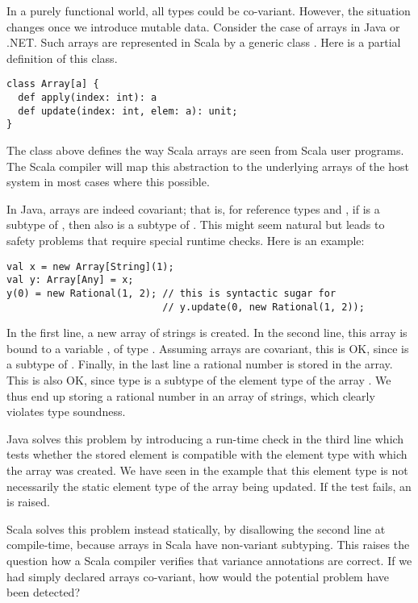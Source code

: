 \documentclass[a4paper,12pt,twoside,titlepage]{book}
\begin{document}
In a purely functional world, all types could be co-variant. However,
the situation changes once we introduce mutable data. Consider the
case of arrays in Java or .NET. Such arrays are represented in Scala
by a generic class . Here is a partial definition of this
class.
\begin{lstlisting}
class Array[a] {
  def apply(index: int): a
  def update(index: int, elem: a): unit;
}
\end{lstlisting}
The class above defines the way Scala arrays are seen from Scala user
programs. The Scala compiler will map this abstraction to the
underlying arrays of the host system in most cases where this
possible.

In Java, arrays are indeed covariant; that is, for reference types
 and , if  is a subtype of , then also
 is a subtype of . This might seem
natural but leads to safety problems that require special runtime
checks. Here is an example:
\begin{lstlisting}
val x = new Array[String](1);
val y: Array[Any] = x;
y(0) = new Rational(1, 2); // this is syntactic sugar for 
                           // y.update(0, new Rational(1, 2));
\end{lstlisting}
In the first line, a new array of strings is created. In the second
line, this array is bound to a variable , of type
.  Assuming arrays are covariant, this is OK, since
 is a subtype of . Finally, in
the last line a rational number is stored in the array. This is also
OK, since type  is a subtype of the element type
 of the array . We thus end up storing a rational
number in an array of strings, which clearly violates type soundness. 

Java solves this problem by introducing a run-time check in the third
line which tests whether the stored element is compatible with the
element type with which the array was created. We have seen in the
example that this element type is not necessarily the static element
type of the array being updated. If the test fails, an
 is raised.

Scala solves this problem instead statically, by disallowing the
second line at compile-time, because arrays in Scala have non-variant
subtyping. This raises the question how a Scala compiler verifies that
variance annotations are correct. If we had simply declared arrays
co-variant, how would the potential problem have been detected?
\end{document}
